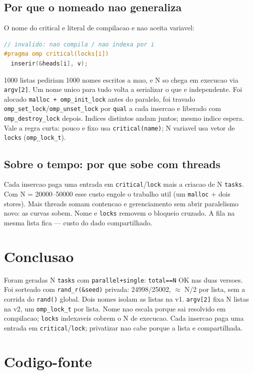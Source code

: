 \documentclass[11pt,letterpaper]{article}
\begin{document}
\subsection{Por que o nomeado nao generaliza}
O nome do critical e literal de compilacao e nao aceita variavel:
\begin{lstlisting}[language=C,caption={Nao indexavel: nome precisa ser literal}]
// invalido: nao compila / nao indexa por i
#pragma omp critical(locks[i])
  inserir(&heads[i], v);
\end{lstlisting}
1000 listas pediriam 1000 nomes escritos a mao, e N so chega em execucao via \texttt{argv[2]}. Um nome unico para tudo volta a serializar o que e independente. Foi alocado \texttt{malloc + omp\_init\_lock} antes do paralelo, foi travado \texttt{omp\_set\_lock}/\texttt{omp\_unset\_lock} por \texttt{qual} a cada insercao e liberado com \texttt{omp\_destroy\_lock} depois. Indices distintos andam juntos; mesmo indice espera. Vale a regra curta: pouco e fixo usa \texttt{critical(name)}; N variavel usa vetor de \texttt{locks} (\texttt{omp\_lock\_t}).
\subsection{Sobre o tempo: por que sobe com threads}
Cada insercao paga uma entrada em \texttt{critical}/\texttt{lock} mais a criacao de N \texttt{tasks}. Com N = 20000--50000 esse custo engole o trabalho util (um \texttt{malloc} + dois stores). Mais threads somam contencao e gerenciamento sem abrir paralelismo novo: as curvas sobem. Nome e \texttt{locks} removem o bloqueio cruzado. A fila na mesma lista fica — custo do dado compartilhado.
\section{Conclusao}
Foram geradas N \texttt{tasks} com \texttt{parallel+single}: \texttt{total==N} OK nas duas versoes. Foi sorteado com \texttt{rand\_r(\&seed)} privada: 24998/25002, $\approx$ N/2 por lista, sem a corrida do \texttt{rand()} global. Dois nomes isolam as listas na v1. \texttt{argv[2]} fixa N listas na v2, um \texttt{omp\_lock\_t} por lista. Nome nao escala porque sai resolvido em compilacao; \texttt{locks} indexaveis cobrem o N de execucao. Cada insercao paga uma entrada em \texttt{critical}/\texttt{lock}; privatizar nao cabe porque a lista e compartilhada.
\appendix
\newpage
\section{Codigo-fonte}


\end{document}
